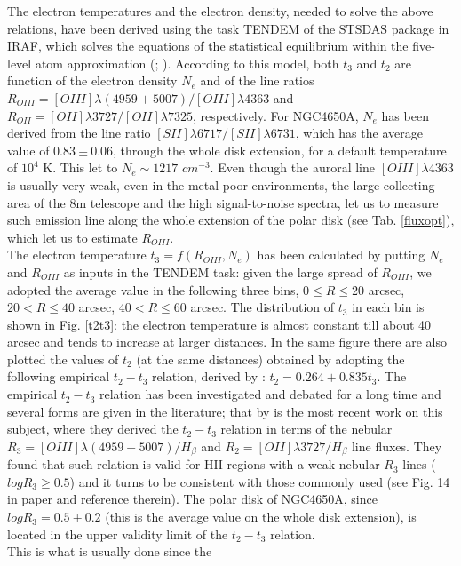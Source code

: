 \documentclass[12pt,preprint]{aastex}
\begin{document}
The electron temperatures and the electron density, needed to solve
the above relations, have been derived using the task TENDEM of the
STSDAS package in IRAF, which solves the equations of the statistical
equilibrium within the five-level atom approximation (\citealt{Der87};
\citealt{Sha95}). According to this model, both $t_3$ and $t_2$ are
function of the electron density $N_e$ and of the line ratios
$R_{OIII} = [OIII]\lambda(4959+5007)/[OIII]\lambda4363$ and $R_{OII} =
[OII]\lambda3727/[OII]\lambda7325$, respectively. For NGC4650A, $N_e$
has been derived from the line ratio
$[SII]\lambda6717/[SII]\lambda6731$, which has the average value of
$0.83 \pm 0.06$, through the whole disk extension, for a default
temperature of $10^4$ K. This let to $N_e \sim 1217$ $cm^{-3}$. Even
though the auroral line $[OIII]\lambda4363$ is usually very weak, even
in the metal-poor environments, the large collecting area of the 8m
telescope and the high signal-to-noise spectra, let us to measure such
emission line along the whole extension of the polar disk (see
Tab. \ref{fluxopt}), which let us to estimate $R_{OIII}$.\\ The
electron temperature $t_3=f(R_{OIII},N_e)$ has been calculated by
putting $N_e$ and $R_{OIII}$ as inputs in the TENDEM task: given the
large spread of $R_{OIII}$, we adopted the average value in the
following three bins, $0\leq R \leq 20$ arcsec, $20 < R \leq 40$
arcsec, $40< R \leq 60$ arcsec. The distribution of $t_3$ in each bin
is shown in Fig. \ref{t2t3}: the electron temperature is almost
constant till about 40 arcsec and tends to increase at larger
distances. In the same figure there are also plotted the values of
$t_2$ (at the same distances) obtained by adopting the following
empirical $t_2 - t_3$ relation, derived by \citet{Pil09}:
$t_2=0.264+0.835t_3$. The empirical $t_2 - t_3$ relation has been
investigated and debated for a long time and several forms are given
in the literature; that by \citet{Pil09} is the most recent work on
this subject, where they derived the $t_2 - t_3$ relation in terms of
the nebular $R_3 = [OIII]\lambda(4959+5007)/H_{\beta}$ and $R_2 =
[OII]\lambda3727/H_{\beta}$ line fluxes. They found that such relation is
valid for HII regions with a weak nebular $R_3$ lines ($logR_3 \ge
0.5$) and it turns to be consistent with those commonly used (see
Fig. 14 in \citet{Pil09} paper and reference therein). The polar disk
of NGC4650A, since $logR_3 = 0.5 \pm 0.2$ (this is the average value
on the whole disk extension), is located in the upper validity limit
of the $t_2 - t_3$ relation.\\ This is what is usually done since the
\end{document}

